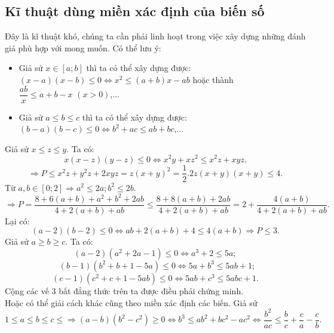 \subsection{Kĩ thuật dùng miền xác định của biến số}
Đây là kĩ thuật khó, chúng ta cần phải linh hoạt trong việc xây dựng những đánh giá phù hợp với mong muốn. Có thể lưu ý:
\begin{itemize}
\item Giả sử $x\in \left[ a;b \right]$ thì ta có thể xây dựng được: $\left( x-a \right)\left( x-b \right)\le 0\Leftrightarrow {{x}^{2}}\le \left( a+b \right)x-ab$ hoặc thành $\dfrac{ab}{x}\le a+b-x\,\,\left( x>0 \right)$,...
\item Giả sử $a\le b\le c$ thì ta có thể xây dựng được: $\left( b-a \right)\left( b-c \right)\le 0\Leftrightarrow {{b}^{2}}+ac\le ab+bc$,...
\end{itemize}
\hda  Giả sử $x\le z\le y$. Ta có: \[x\left( x-z \right)\left( y-z \right)\le 0\Leftrightarrow {{x}^{2}}y+x{{z}^{2}}\le {{x}^{2}}z+xyz.\]
\[\Rightarrow P\le {{x}^{2}}z+{{y}^{2}}z+2xyz=z{{\left( x+y \right)}^{2}}=\frac{1}{2}.2z\left( x+y \right)\left( x+y \right)\le 4.\]
\hda  Từ $a,b\in \left[ 0;2 \right]\Rightarrow {{a}^{2}}\le 2a;{{b}^{2}}\le 2b$.
\[\Rightarrow P=\frac{8+6\left( a+b \right)+{{a}^{2}}+{{b}^{2}}+2ab}{4+2\left( a+b \right)+ab}\le \frac{8+8\left( a+b \right)+2ab}{4+2\left( a+b \right)+ab}=2+\frac{4\left( a+b \right)}{4+2\left( a+b \right)+ab}.\]
Lại có: \[\left( a-2 \right)\left( b-2 \right)\le 0\Leftrightarrow ab+2\left( a+b \right)+4\le 4\left( a+b \right)\Rightarrow P\le 3.\]
\hda  Giả sử $a\ge b\ge c$. Ta có: \[\left( a-2 \right)\left( {{a}^{2}}+2a-1 \right)\le 0\Leftrightarrow {{a}^{3}}+2\le 5a;\]
\[\,\,\,\left( b-1 \right)\left( {{b}^{2}}+b+1-5a \right)\le 0\Leftrightarrow 5a+{{b}^{3}}\le 5ab+1;\]
\[\left( c-1 \right)\left( {{c}^{2}}+c+1-5ab \right)\le 0\Leftrightarrow 5ab+{{c}^{3}}\le 5abc+1.\]
Cộng các vế 3 bất đẳng thức trên ta được điều phải chứng minh.\\
Hoặc có thể giải cách khác cũng theo miền xác định các biến.
Giả sử \[1\le a\le b\le c\le \Rightarrow \left( a-b \right)\left( {{b}^{2}}-{{c}^{2}} \right)\ge 0\Leftrightarrow {{b}^{3}}\le a{{b}^{2}}+b{{c}^{2}}-a{{c}^{2}}\Leftrightarrow \frac{{{b}^{2}}}{ac}\le \frac{b}{c}+\frac{c}{a}-\frac{c}{b}.\]
